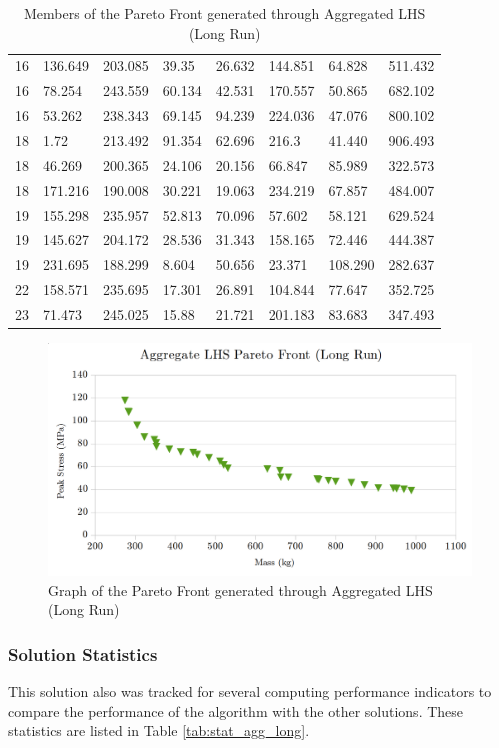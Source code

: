 \begin{table}[!htbp]
\begin{tabular}{|p{1.5cm}p{1.5cm}p{1.5cm}p{1.4cm}p{2cm}p{2cm}||p{1.5cm}p{1.5cm}|}
16&136.649&203.085&39.35&26.632&144.851&64.828&511.432\\
16&78.254&243.559&60.134&42.531&170.557&50.865&682.102\\
16&53.262&238.343&69.145&94.239&224.036&47.076&800.102\\
18&1.72&213.492&91.354&62.696&216.3&41.440&906.493\\
18&46.269&200.365&24.106&20.156&66.847&85.989&322.573\\
18&171.216&190.008&30.221&19.063&234.219&67.857&484.007\\
19&155.298&235.957&52.813&70.096&57.602&58.121&629.524\\
19&145.627&204.172&28.536&31.343&158.165&72.446&444.387\\
19&231.695&188.299&8.604&50.656&23.371&108.290&282.637\\
22&158.571&235.695&17.301&26.891&104.844&77.647&352.725\\
23&71.473&245.025&15.88&21.721&201.183&83.683&347.493\\
\hline
\end{tabular}
\caption{Members of the Pareto Front generated through Aggregated LHS (Long Run)}
\label{tab:pfront_agg_long}
\end{table}

\begin{figure}[!hbp]
\includegraphics[width=\textwidth]{img/pf_agg_long.png}
\caption{Graph of the Pareto Front generated through Aggregated LHS (Long Run)}
\label{fig:pfront_agg_long}
\end{figure}

\subsubsection{Solution Statistics}
This solution also was tracked for several computing performance indicators to compare the performance of the algorithm with the other solutions. These statistics are listed in Table \ref{tab:stat_agg_long}. 

